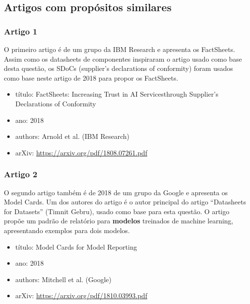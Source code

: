 \documentclass[a4paper]{article}    %
\begin{document}
\subsection{Artigos com propósitos similares}

\subsubsection{Artigo 1}
O primeiro artigo é de um grupo da IBM Research e apresenta os FactSheets. Assim como os datasheets de componentes inspiraram o artigo usado como base desta questão, os SDoCs (supplier’s declarations of conformity) foram usados como base neste artigo de 2018 para propor os FactSheets.

\begin{itemize}
    \setlength\itemsep{0mm}
    \item título: FactSheets:  Increasing Trust in AI Servicesthrough Supplier’s Declarations of Conformity
    \item ano: 2018
    \item authors: Arnold et al. (IBM Research)
    \item arXiv: \href{https://arxiv.org/pdf/1808.07261.pdf}{https://arxiv.org/pdf/1808.07261.pdf}
\end{itemize}

\subsubsection{Artigo 2}
O segundo artigo também é de 2018 de um grupo da Google e apresenta os Model Cards. Um dos autores do artigo é o autor principal do artigo ``Datasheets for Datasets'' (Timnit Gebru), usado como base para esta questão. O artigo propõe um padrão de relatório para \textbf{modelos} treinados de machine learning, apresentando exemplos para dois modelos.

\begin{itemize}
    \setlength\itemsep{0mm}
    \item título: Model Cards for Model Reporting
    \item ano: 2018
    \item authors: Mitchell et al. (Google)
    \item arXiv: \href{https://arxiv.org/pdf/1810.03993.pdf}{https://arxiv.org/pdf/1810.03993.pdf}
\end{itemize}
\end{document}
